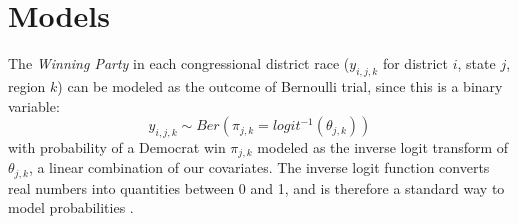 \documentclass[12pt]{article}
\newcommand{\red}[1]{\textcolor{red}{#1}}
\begin{document}



\section{Models}

%
%
%
%

The \textit{Winning Party} in each congressional district race ($y_{i,j,k}$ for district $i$, state $j$, region $k$) can be modeled as the outcome of Bernoulli trial, since this is a binary variable: 
\begin{equation}
	y_{i,j,k} \sim Ber \left( \pi_{j,k} = logit^{-1}(\theta_{j,k})  \right)
\end{equation}
with probability of a Democrat win $\pi_{j,k}$ modeled as the inverse logit transform of $\theta_{j,k}$, a linear combination of our covariates. The inverse logit function converts real numbers into quantities between 0 and 1, and is therefore a standard way to model probabilities \parencite{logitlink}.
\end{document}
